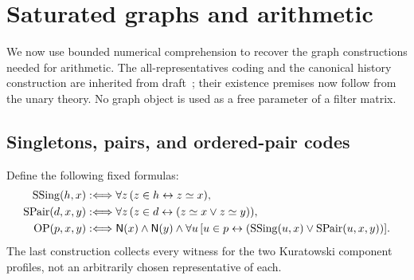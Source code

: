 \section{Saturated graphs and arithmetic}\label{un:arithmetic}

We now use bounded numerical comprehension to recover the graph
constructions needed for arithmetic. The all-representatives coding and
the canonical history construction are inherited from
draft~\cite{draftC2}; their existence premises now follow from the unary
theory. No graph object is used as a free parameter of a filter matrix.

\subsection{Singletons, pairs, and ordered-pair codes}

Define the following fixed formulas:
\begin{align*}
 \operatorname{SSing}(h,x)&:\Longleftrightarrow
             \forall z\,(z\in h\leftrightarrow z\mathrel{\simeq} x),\\
 \operatorname{SPair}(d,x,y)&:\Longleftrightarrow
             \forall z\,(z\in d\leftrightarrow(z\mathrel{\simeq} x\lor z\mathrel{\simeq} y)),\\
 \operatorname{OP}(p,x,y)&:\Longleftrightarrow
       \mathsf{N}(x)\land\mathsf{N}(y)\land
       \forall u\,[u\in p\leftrightarrow
          (\operatorname{SSing}(u,x)\lor\operatorname{SPair}(u,x,y))].
\end{align*}
The last construction collects every witness for the two Kuratowski
component profiles, not an arbitrarily chosen representative of each.

